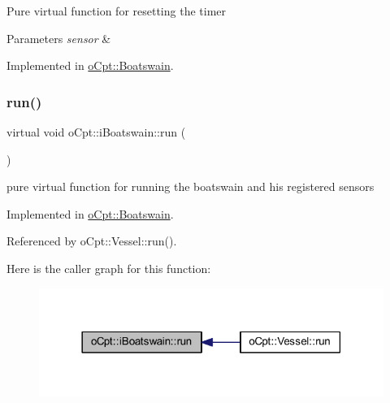 Pure virtual function for resetting the timer 
\begin{DoxyParams}{Parameters}
{\em sensor} & \\
\hline
\end{DoxyParams}


Implemented in \hyperlink{classo_cpt_1_1_boatswain_aca864b4219485c6d83ad0e92c7ea16fd}{o\+Cpt\+::\+Boatswain}.

\hypertarget{classo_cpt_1_1i_boatswain_a4512e742ba996b32dcc452d9f180724a}{}\label{classo_cpt_1_1i_boatswain_a4512e742ba996b32dcc452d9f180724a} 
\subsubsection{\texorpdfstring{run()}{run()}}
{\footnotesize\ttfamily virtual void o\+Cpt\+::i\+Boatswain\+::run (\begin{DoxyParamCaption}{ }\end{DoxyParamCaption})\hspace{0.3cm}{\ttfamily [pure virtual]}}

pure virtual function for running the boatswain and his registered sensors 

Implemented in \hyperlink{classo_cpt_1_1_boatswain_a7665a4439b8e71ece31ff5e9755caf09}{o\+Cpt\+::\+Boatswain}.



Referenced by o\+Cpt\+::\+Vessel\+::run().

Here is the caller graph for this function\+:\nopagebreak
\begin{figure}[H]
\begin{center}
\leavevmode
\includegraphics[width=318pt]{classo_cpt_1_1i_boatswain_a4512e742ba996b32dcc452d9f180724a_icgraph}
\end{center}
\end{figure}
\hypertarget{classo_cpt_1_1i_boatswain_ac4c9a286c90132944dfab6df31900fc3}{}\label{classo_cpt_1_1i_boatswain_ac4c9a286c90132944dfab6df31900fc3} 
